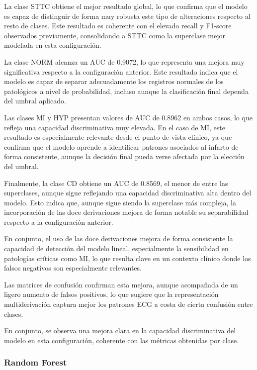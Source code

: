 \documentclass[12pt,a4paper,twoside]{book}
\begin{document}
La clase STTC obtiene el mejor resultado global, lo que confirma que el modelo es capaz de distinguir de forma muy robusta este tipo de alteraciones respecto al resto de clases. 
Este resultado es coherente con el elevado recall y F1-score observados previamente, consolidando a STTC como la superclase mejor modelada en esta configuración.

La clase NORM alcanza un AUC de 0.9072, lo que representa una mejora muy significativa respecto a la configuración anterior. 
Este resultado indica que el modelo es capaz de separar adecuadamente los registros normales de los patológicos a nivel de probabilidad, incluso aunque la clasificación final dependa del umbral aplicado.

Las clases MI y HYP presentan valores de AUC de 0.8962 en ambos casos, lo que refleja una capacidad discriminativa muy elevada. 
En el caso de MI, este resultado es especialmente relevante desde el punto de vista clínico, ya que confirma que el modelo aprende a identificar patrones asociados al infarto de forma consistente, aunque la decisión final pueda verse afectada por la elección del umbral.

Finalmente, la clase CD obtiene un AUC de 0.8569, el menor de entre las superclases, aunque sigue reflejando una capacidad discriminativa alta dentro del modelo.
Esto indica que, aunque sigue siendo la superclase más compleja, la incorporación de las doce derivaciones mejora de forma notable su separabilidad respecto a la configuración anterior.

\vspace{0.5cm}

En conjunto, el uso de las doce derivaciones mejora de forma consistente la capacidad de detección del modelo lineal, especialmente la sensibilidad en patologías críticas como MI, lo que resulta clave en un contexto clínico donde los falsos negativos son especialmente relevantes.

Las matrices de confusión confirman esta mejora, aunque acompañada de un ligero aumento de falsos positivos, lo que sugiere que la representación multiderivación captura mejor los patrones ECG a costa de cierta confusión entre clases.

En conjunto, se observa una mejora clara en la capacidad discriminativa del modelo en esta configuración, coherente con las métricas obtenidas por clase.

\subsubsection*{Random Forest}
\end{document}
